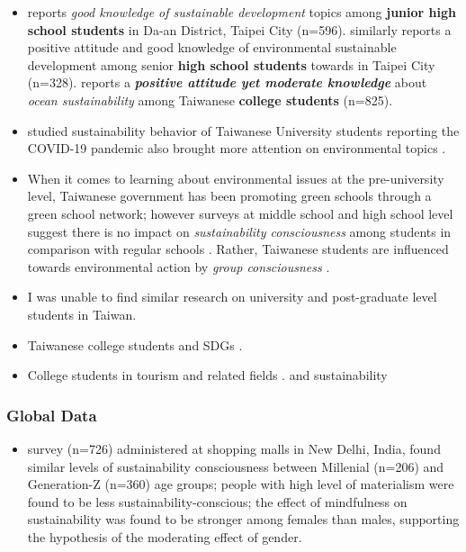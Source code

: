 \documentclass[
  letterpaper,
  DIV=11,
  numbers=noendperiod]{scrartcl}
\providecommand{\tightlist}{%
  \setlength{\itemsep}{0pt}\setlength{\parskip}{0pt}}\usepackage{longtable,booktabs,array}
\begin{document}
\begin{itemize}
\item
  \citep{GuoZhongXueShengWeiLi2003} reports \emph{good knowledge of
  sustainable development} topics among \textbf{junior high school
  students} in Da-an District, Taipei City (n=596).
  \citep{GaoZhongXueShengWeiLi2009} similarly reports a positive
  attitude and good knowledge of environmental sustainable development
  among senior \textbf{high school students} towards in Taipei City
  (n=328). \citep{chenMarineEnvironmentalAwareness2016} reports a
  \textbf{\emph{positive attitude yet moderate knowledge}} about
  \emph{ocean sustainability} among Taiwanese \textbf{college students}
  (n=825).
\item
  \citep{liuDigitalCapabilityDigital2023} studied sustainability
  behavior of Taiwanese University students reporting the COVID-19
  pandemic also brought more attention on environmental topics .
\item
  When it comes to learning about environmental issues at the
  pre-university level, Taiwanese government has been promoting green
  schools through a green school network; however surveys at middle
  school and high school level suggest there is no impact on
  \emph{sustainability consciousness} among students in comparison with
  regular schools \citep{olssonGreenSchoolsTaiwan2019}. Rather,
  Taiwanese students are influenced towards environmental action by
  \emph{group consciousness}
  \citep{yuUnderstandingTaiwaneseUndergraduate2017}.
\item
  I was unable to find similar research on university and post-graduate
  level students in Taiwan.
\item
  Taiwanese college students and SDGs
  \citep{hoImportancePerformanceSDGs2022}.
\item
  College students in tourism and related fields . and sustainability
\end{itemize}

\subsubsection{Global Data}\label{global-data}

\begin{itemize}
\tightlist
\item
  \citep{manchandaCultivatingSustainabilityConsciousness2023} survey
  (n=726) administered at shopping malls in New Delhi, India, found
  similar levels of sustainability consciousness between Millenial
  (n=206) and Generation-Z (n=360) age groups; people with high level of
  materialism were found to be less sustainability-conscious; the effect
  of mindfulness on sustainability was found to be stronger among
  females than males, supporting the hypothesis of the moderating effect
  of gender.
\end{itemize}
\end{document}
